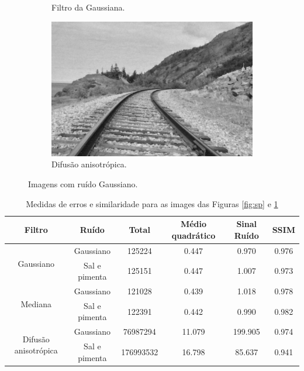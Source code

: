\documentclass[10pt,a4paper]{article}
\begin{document}
\begin{figure}[!ht]
\begin{subfigure}[ht]{0.45\textwidth}
        \caption{Filtro da Gaussiana.}
    \end{subfigure}
    \qquad
    \begin{subfigure}[ht]{0.45\textwidth}
        \includegraphics[width=\textwidth]{ga_aniso.jpg}
        \caption{Difusão anisotrópica.}
    \end{subfigure}
    \caption{Imagens com ruído Gaussiano.}
    \label{fig:ga}
\end{figure}

\begin{table}[!ht]
\begin{tabular}{cccccc}
\toprule
Filtro & Ruído & Total & Médio quadrático & Sinal Ruído & SSIM \\ \midrule
\multirow{2}{*}{Gaussiano}              & Gaussiano         & 125224 & 0.447 & 0.970 & 0.976 \\
                                        & Sal e pimenta     & 125151 & 0.447 & 1.007 & 0.973 \\\midrule
\multirow{2}{*}{Mediana}                & Gaussiano         & 121028 & 0.439 & 1.018 & 0.978\\
                                        & Sal e pimenta     & 122391 & 0.442 & 0.990 & 0.982\\\midrule
\multirow{2}{*}{Difusão anisotrópica}   & Gaussiano         & 76987294 & 11.079 & 199.905 & 0.974 \\
                                          & Sal e pimenta   & 176993532 & 16.798 & 85.637 & 0.941 \\\bottomrule
\end{tabular}
\caption{Medidas de erros e similaridade para as images das Figuras \ref{fig:sp} e \ref{fig:ga}}
\label{tab:results}
\end{table}
\end{document}
